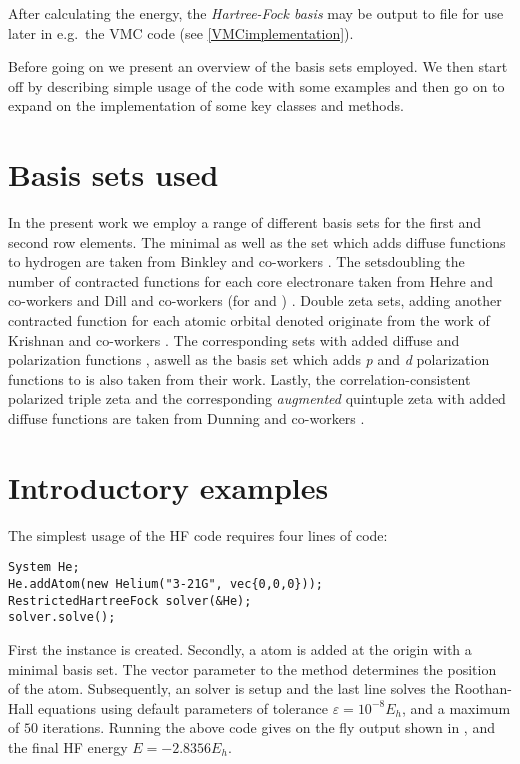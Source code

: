 \documentclass[../../master.tex]{subfiles}
\begin{document}
After calculating the energy, the \emph{Hartree-Fock basis} may be output to file for use later in e.g.\ the VMC code (see \ref{VMCimplementation}). 

Before going on we present an overview of the basis sets employed. We then start off by describing simple usage of the code with some examples and then go on to expand on the implementation of some key classes and methods.

\section{Basis sets used \label{basissetsused}}
In the present work we employ a range of different basis sets for the first and second row elements. The minimal  as well as the  set which adds diffuse functions to hydrogen are taken from Binkley and co-workers \cite{binkley1980}. The  sets\textemdash doubling the number of contracted functions for each core electron\textemdash are taken from Hehre and co-workers and Dill and co-workers (for  and ) \cite{hehre1972,dill1975}. Double zeta sets, adding another contracted function for each atomic orbital denoted  originate from the work of Krishnan and co-workers \cite{krishnan1980}. The corresponding sets with added diffuse and polarization functions , aswell as the  basis set which adds \emph{p} and \emph{d} polarization functions to  is also taken from their work. Lastly, the correlation-consistent polarized triple zeta  and the corresponding \emph{augmented}  quintuple zeta with added diffuse functions are taken from Dunning and co-workers \cite{dunning1989}.

\section{Introductory examples \label{hfexample}}
The simplest usage of the HF code requires four lines of \CC{}  code:
\begin{lstlisting}[language={[std]c++}]
System He;
He.addAtom(new Helium("3-21G", vec{0,0,0}));
RestrictedHartreeFock solver(&He);
solver.solve();
\end{lstlisting}
First the  instance is created. Secondly, a  atom is added at the origin with a minimal  basis set. The vector  parameter to the  method determines the position of the atom. Subsequently, an  solver is setup and the last line solves the Roothan-Hall equations using default parameters of tolerance $\varepsilon=10^{-8}E_h$, and a maximum of $50$ iterations. Running the above code gives on the fly output shown in , and the final HF energy $E=-2.8356E_h$.
\end{document}

